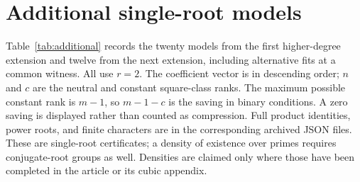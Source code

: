 \documentclass[11pt]{article}
\theoremstyle{definition}\newtheorem{definition}[theorem]{Definition}
\begin{document}
\section{Additional single-root models}\label{app:models}
Table~\ref{tab:additional} records the twenty models from the
first higher-degree extension and twelve from the next extension,
including alternative fits at a common witness. All use $r=2$.
The coefficient vector is in descending order; $n$ and $c$ are
the neutral and constant square-class ranks. The maximum possible
constant rank is $m-1$, so $m-1-c$ is the saving in binary
conditions. A zero saving is displayed rather than counted as
compression. Full product identities, power roots, and finite
characters are in the corresponding archived JSON files. These
are single-root certificates; a density of existence over primes
requires conjugate-root groups as well. Densities are claimed
only where those have been completed in the article or its
cubic appendix.
\end{document}
